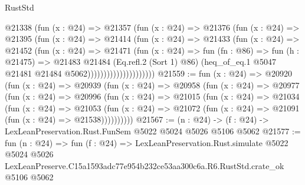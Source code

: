 \begin{lexlean}{RustStd}
\begin{coremodule}
                          @21338
                            (fun (x : @24) =>
                            @21357
                              (fun (x : @24) =>
                              @21376
                                (fun (x : @24) =>
                                @21395
                                  (fun (x : @24) =>
                                  @21414
                                    (fun (x : @24) =>
                                    @21433
                                      (fun (x : @24) =>
                                      @21452
                                        (fun (x : @24) =>
                                        @21471
                                          (fun (x : @24) =>
                                          fun (fn : @86) =>
                                          fun (h : @21475) =>
                                          @21483
                                            @21484
                                            (Eq.refl.{2} (Sort 1) @86)
                                            (heq_of_eq.{1}
                                              @5047
                                              @21481
                                              @21484
                                              @5062)))))))))))))))))))))
@21559 := fun (x : @24) =>
  @20920
    (fun (x : @24) =>
    @20939
      (fun (x : @24) =>
      @20958
        (fun (x : @24) =>
        @20977
          (fun (x : @24) =>
          @20996
            (fun (x : @24) =>
            @21015
              (fun (x : @24) =>
              @21034
                (fun (x : @24) =>
                @21053
                  (fun (x : @24) =>
                  @21072 (fun (x : @24) => @21091 (fun (x : @24) => @21538))))))))))
@21567 := (n : @24) -> (f : @24) -> LexLeanPreservation.Rust.FunSem @5022 @5024 @5026 @5106 @5062
@21577 := fun (n : @24) =>
  fun (f : @24) =>
  LexLeanPreservation.Rust.simulate
    @5022
    @5024
    @5026
    LexLeanPreserve.C15a1593adc77e954b232ce53aa300c6a.R6.RustStd.crate_ok
    @5106
    @5062
\end{coremodule}
\end{lexlean}
